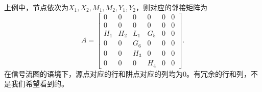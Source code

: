 \begin{example}
    上例中，节点依次为$X_1,X_2,M_1,M_2,Y_1,Y_2$，则对应的邻接矩阵为
    \begin{equation}
        A=\begin{bmatrix}
            0 & 0 & 0 & 0 & 0 & 0 \\
            0 & 0 & 0 & 0 & 0 & 0 \\
            H_1 & H_2 & L_1 & G_5 & 0 & 0 \\
            0 & 0 & G_6 & 0 & 0 & 0 \\
            0 & 0 & H_3 & 0 & 0 & 0 \\
            0 & 0 & 0 & H_4 & 0 & 0
        \end{bmatrix}.
    \end{equation}
    在信号流图的语境下，源点对应的行和阱点对应的列均为$0$。有冗余的行和列，不是我们希望看到的。


\end{example}
